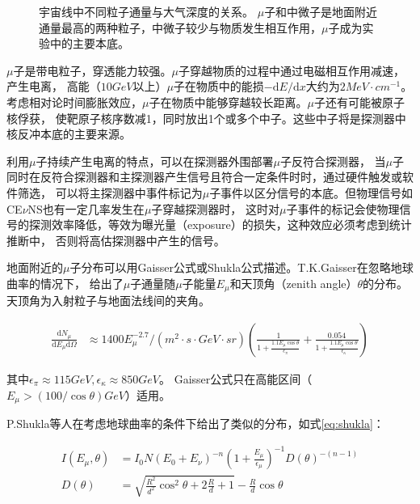 \begin{figure}
    \centering
    
    \caption{\label{fig:vertical_flux} 宇宙线中不同粒子通量与大气深度的关系\cite{olive_review_2016}。
    $\mu$子和中微子是地面附近通量最高的两种粒子，中微子较少与物质发生相互作用，$\mu$子成为实验中的主要本底。}
\end{figure}

$\mu$子是带电粒子，穿透能力较强。$\mu$子穿越物质的过程中通过电磁相互作用减速，产生电离，
高能（$10\si{GeV}$以上）$\mu$子在物质中的能损$-\mathrm{d}E/\mathrm{d}x$大约为$2\si{MeV\cdot cm^{-1}}$。
考虑相对论时间膨胀效应，$\mu$子在物质中能够穿越较长距离。$\mu$子还有可能被原子核俘获，
使靶原子核序数减1，同时放出1个或多个中子。这些中子将是探测器中核反冲本底的主要来源。

利用$\mu$子持续产生电离的特点，可以在探测器外围部署$\mu$子反符合探测器，
当$\mu$子同时在反符合探测器和主探测器产生信号且符合一定条件时时，通过硬件触发或软件筛选，
可以将主探测器中事件标记为$\mu$子事件以区分信号的本底。但物理信号如CE$\nu$NS也有一定几率发生在$\mu$子穿越探测器时，
这时对$\mu$子事件的标记会使物理信号的探测效率降低，等效为曝光量（exposure）的损失，这种效应必须考虑到统计推断中，
否则将高估探测器中产生的信号。

地面附近的$\mu$子分布可以用Gaisser公式或Shukla公式描述。T.K.Gaisser在忽略地球曲率的情况下，
给出了$\mu$子通量随$\mu$子能量$E_\mu$和天顶角（zenith angle）$\theta$的分布。天顶角为入射粒子与地面法线间的夹角\cite{gaisser_cosmic_2016}。

\begin{align}
    \label{eq:gaisser}
    \frac{\mathrm{d}N_\mu}{\mathrm{d}E_\mu\mathrm{d}\Omega} &\approx 
    1400E_\mu^{-2.7}/\left(\si{m^2\cdot s\cdot GeV\cdot sr}\right)\left(\frac{1}{1+\frac{1.1E_\mu\cos\theta}{\epsilon_\pi}}+\frac{0.054}{1+\frac{1.1E_\mu\cos\theta}{\epsilon_\kappa}}\right)
\end{align}

其中$\epsilon_\pi\approx115\si{GeV},\epsilon_\kappa\approx850\si{GeV}$。
Gaisser公式只在高能区间（$E_\mu>(100/\cos\theta)\si{GeV}$）适用。

P.Shukla等人在考虑地球曲率的条件下给出了类似的分布\cite{shukla_energy_2018}，如式\ref{eq:shukla}：

\begin{align}
    \label{eq:shukla}
    I\left(E_\mu,\theta\right) &= I_0 N\left(E_0+E_\nu\right)^{-n}\left(1 + \frac{E_\mu}{\epsilon_\mu}\right)^{-1}D(\theta)^{-(n-1)} \\
    D(\theta) &= \sqrt{\frac{R^2}{d^2}\cos^2\theta+2\frac{R}{d}+1}-\frac{R}{d}\cos\theta
\end{align}

